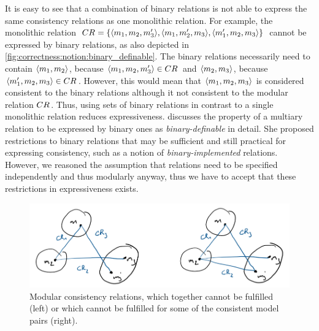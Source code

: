 It is easy to see that a combination of binary relations is not able to express the same consistency relations as one monolithic relation.
For example, the monolithic relation $CR_{} = \{ \langle m_{1}, m_{2}, m_{3}' \rangle, \langle m_{1}, m_{2}', m_{3} \rangle, \langle m_{1}', m_{2}, m_{3} \rangle \}$ cannot be expressed by binary relations, as also depicted in \autoref{fig:correctness:notion:binary_definable}.
The binary relations necessarily need to contain $\langle m_{1}, m_{2} \rangle$, because $\langle m_{1}, m_{2}, m_{3}' \rangle \in CR_{}$ and $\langle m_{2}, m_{3} \rangle$, because $\langle m_{1}', m_{2}, m_{3} \rangle \in CR_{}$. However, this would mean that $\langle m_{1}, m_{2}, m_{3} \rangle$ is considered consistent to the binary relations although it not consistent to the modular relation $CR_{}$.
Thus, using sets of binary relations in contrast to a single monolithic relation reduces expressiveness.
\textcite{stevens2017a} discusses the property of a multiary relation to be expressed by binary ones as \emph{binary-definable} in detail.
She proposed restrictions to binary relations that may be sufficient and still practical for expressing consistency, such as a notion of \emph{binary-implemented} relations.
However, we reasoned the assumption that relations need to be specified independently and thus modularly anyway, thus we have to accept that these restrictions in expressiveness exists.

\begin{figure}
    \centering
    \includegraphics[width=\textwidth]{figures/correctness/notion/contradictions_example.png}
    \caption[Example for incompatible consistency relations]{Modular consistency relations, which together cannot be fulfilled (left) or which cannot be fulfilled for some of the consistent model pairs (right).}
    \label{fig:correctness:notion:contradictions_example}
\end{figure}

